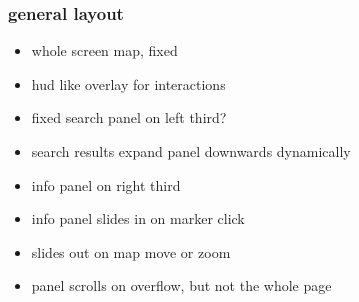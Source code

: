 \documentclass[10pt]{article}
\begin{document}
            \subsubsection{general layout}
                \begin{itemize}
                    \item whole screen map, fixed
                    \item hud like overlay for interactions

                    \item fixed search panel on left third?
                    \item search results expand panel downwards dynamically

                    \item info panel on right third
                    \item info panel slides in on marker click
                    \item slides out on map move or zoom
                    \item panel scrolls on overflow, but not the whole page
                \end{itemize}
\end{document}
